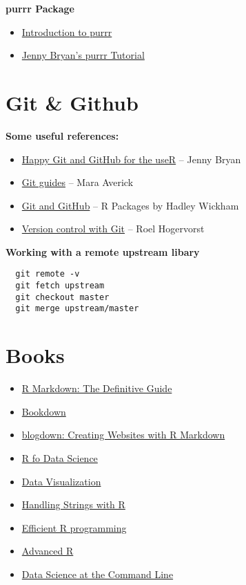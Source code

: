 \documentclass[]{book}
\providecommand{\tightlist}{%
  \setlength{\itemsep}{0pt}\setlength{\parskip}{0pt}}
\theoremstyle{definition}
\theoremstyle{definition}
\theoremstyle{definition}
\theoremstyle{remark}
\begin{document}
\textbf{purrr Package}

\begin{itemize}
\tightlist
\item
  \href{https://github.com/jenniferthompson/RLadiesIntroToPurrr}{Introduction
  to purrr}
\item
  \href{https://jennybc.github.io/purrr-tutorial/}{Jenny Bryan's purrr
  Tutorial}
\end{itemize}

\section{Git \& Github}\label{git-github}

\textbf{Some useful references:}

\begin{itemize}
\tightlist
\item
  \href{http://happygitwithr.com/}{Happy Git and GitHub for the useR} --
  Jenny Bryan
\item
  \href{Happy\%20Git\%20and\%20GitHub\%20for\%20the\%20useR}{Git guides}
  -- Mara Averick
\item
  \href{http://r-pkgs.had.co.nz/git.html}{Git and GitHub} -- R Packages
  by Hadley Wickham
\item
  \href{https://rmhogervorst.nl/cleancode/blog/2016/03/01/content/post/2016-03-01-version-control-start/}{Version
  control with Git} -- Roel Hogervorst
\end{itemize}

\textbf{Working with a remote upstream libary}

\begin{verbatim}
  git remote -v
  git fetch upstream
  git checkout master
  git merge upstream/master
\end{verbatim}

\section{Books}\label{books}

\begin{itemize}
\tightlist
\item
  \href{https://bookdown.org/yihui/rmarkdown/}{R Markdown: The
  Definitive Guide}
\item
  \href{https://bookdown.org/yihui/bookdown/}{Bookdown}
\item
  \href{https://bookdown.org/yihui/blogdown/}{blogdown: Creating
  Websites with R Markdown}
\item
  \href{http://r4ds.had.co.nz/}{R fo Data Science}
\item
  \href{https://socviz.co/}{Data Visualization}
\item
  \href{Handling\%20Strings\%20with\%20R}{Handling Strings with R}
\item
  \href{https://bookdown.org/csgillespie/efficientR/}{Efficient R
  programming}
\item
  \href{https://adv-r.hadley.nz/}{Advanced R}
\item
  \href{https://www.datascienceatthecommandline.com/}{Data Science at
  the Command Line}
\end{itemize}
\end{document}
